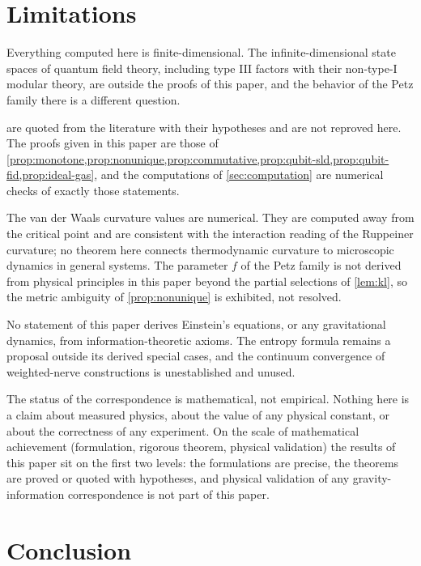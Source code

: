 \documentclass[11pt,letterpaper]{article}
\theoremstyle{definition}
\theoremstyle{remark}
\begin{document}
\section{Limitations}
\label{sec:limitations}

Everything computed here is finite-dimensional. The infinite-dimensional state spaces of quantum field theory, including type III factors with their non-type-I modular theory, are outside the proofs of this paper, and the behavior of the Petz family there is a different question.

 are quoted from the literature with their hypotheses and are not reproved here. The proofs given in this paper are those of \cref{prop:monotone,prop:nonunique,prop:commutative,prop:qubit-sld,prop:qubit-fid,prop:ideal-gas}, and the computations of \cref{sec:computation} are numerical checks of exactly those statements.

The van der Waals curvature values are numerical. They are computed away from the critical point and are consistent with the interaction reading of the Ruppeiner curvature; no theorem here connects thermodynamic curvature to microscopic dynamics in general systems. The parameter $f$ of the Petz family is not derived from physical principles in this paper beyond the partial selections of \cref{lem:kl}, so the metric ambiguity of \cref{prop:nonunique} is exhibited, not resolved.

No statement of this paper derives Einstein's equations, or any gravitational dynamics, from information-theoretic axioms. The entropy formula remains a proposal outside its derived special cases, and the continuum convergence of weighted-nerve constructions is unestablished and unused.

The status of the correspondence is mathematical, not empirical. Nothing here is a claim about measured physics, about the value of any physical constant, or about the correctness of any experiment. On the scale of mathematical achievement (formulation, rigorous theorem, physical validation) the results of this paper sit on the first two levels: the formulations are precise, the theorems are proved or quoted with hypotheses, and physical validation of any gravity-information correspondence is not part of this paper.

\section{Conclusion}
\label{sec:conclusion}
\end{document}

